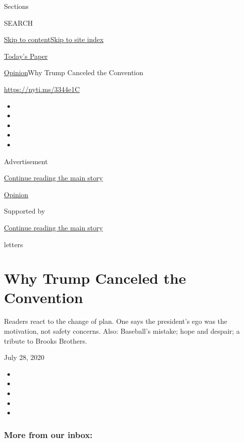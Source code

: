 Sections

SEARCH

\protect\hyperlink{site-content}{Skip to
content}\protect\hyperlink{site-index}{Skip to site index}

\href{https://myaccount.nytimes3xbfgragh.onion/auth/login?response_type=cookie\&client_id=vi}{}

\href{https://www.nytimes3xbfgragh.onion/section/todayspaper}{Today's
Paper}

\href{/section/opinion}{Opinion}\textbar{}Why Trump Canceled the
Convention

\url{https://nyti.ms/3344e1C}

\begin{itemize}
\item
\item
\item
\item
\item
\end{itemize}

Advertisement

\protect\hyperlink{after-top}{Continue reading the main story}

\href{/section/opinion}{Opinion}

Supported by

\protect\hyperlink{after-sponsor}{Continue reading the main story}

letters

\hypertarget{why-trump-canceled-the-convention}{%
\section{Why Trump Canceled the
Convention}\label{why-trump-canceled-the-convention}}

Readers react to the change of plan. One says the president's ego was
the motivation, not safety concerns. Also: Baseball's mistake; hope and
despair; a tribute to Brooks Brothers.

July 28, 2020

\begin{itemize}
\item
\item
\item
\item
\item
\end{itemize}

\hypertarget{more-from-our-inbox}{%
\subsubsection{More from our inbox:}\label{more-from-our-inbox}}

